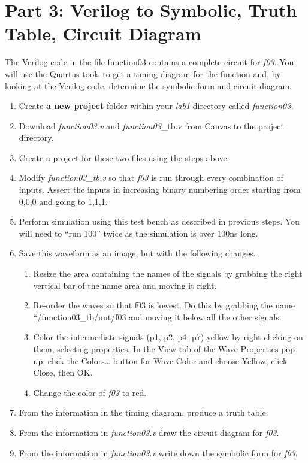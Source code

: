 \hypertarget{part-3-verilog-to-symbolic-truth-table-circuit-diagram}{%
\section{Part 3: Verilog to Symbolic, Truth Table, Circuit Diagram}
\label{part-3-verilog-to-symbolic-truth-table-circuit-diagram}}

The Verilog code in the file function03 contains a complete circuit for
\emph{f03}. You will use the Quartus tools to get a timing diagram for
the function and, by looking at the Verilog code, determine the symbolic
form and circuit diagram.

\begin{enumerate}
\def\labelenumi{\arabic{enumi}.}
\item
  Create \textbf{a new project} folder within your \emph{lab1} directory
  called \emph{function03.}
\item
  Download \emph{function03.v} and \emph{function03}\_tb.v from Canvas
  to the project directory.
\item
  Create a project for these two files using the steps above.
\item
  Modify \emph{function03\_tb.v} so that \emph{f03} is run through every
  combination of inputs. Assert the inputs in increasing binary
  numbering order starting from 0,0,0 and going to 1,1,1.
\item
  Perform simulation using this test bench as described in previous
  steps. You will need to ``run 100'' twice as the simulation is over
  100ns long.
\item
  \protect\hypertarget{Part_3_Step_6}{}{}Save this waveform as an image,
  but with the following changes.

  \begin{enumerate}
  \def\labelenumii{\alph{enumii}.}
  \item
    Resize the area containing the names of the signals by grabbing the
    right vertical bar of the name area and moving it right.
  \item
    Re-order the waves so that f03 is lowest. Do this by grabbing the
    name ``/function03\_tb/uut/f03 and moving it below all the other
    signals.
  \item
    Color the intermediate signals (p1, p2, p4, p7) yellow by right
    clicking on them, selecting properties. In the View tab of the Wave
    Properties pop-up, click the Colors\ldots{} button for Wave Color
    and choose Yellow, click Close, then OK.
  \item
    Change the color of \emph{f03} to red.
  \end{enumerate}
\item
  \protect\hypertarget{Part_3_Step_7}{}{}From the information in the
  timing diagram, produce a truth table.
\item
  \protect\hypertarget{Part_3_Step_8}{}{}From the information in
  \emph{function03.v} draw the circuit diagram for \emph{f03}.
\item
  \protect\hypertarget{Part_3_Step_9}{}{}From the information in
  \emph{function03.v} write down the symbolic form for \emph{f03}.
\end{enumerate}

